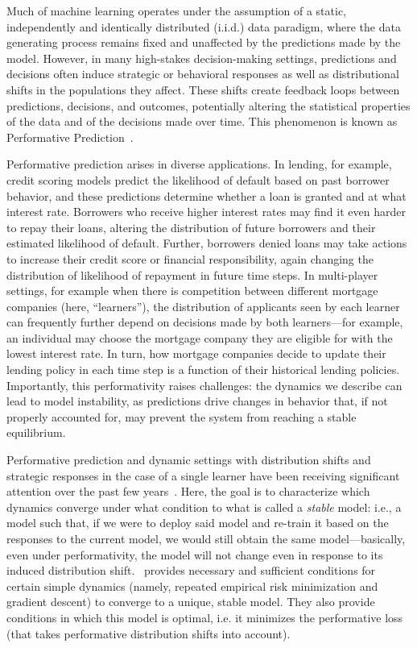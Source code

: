 Much of machine learning operates under the assumption of a static, independently and identically distributed (i.i.d.) data paradigm, where the data generating process remains fixed and unaffected by the predictions made by the model. However, in many high-stakes decision-making settings, predictions and decisions often induce strategic or behavioral responses as well as distributional shifts in the populations they affect. These shifts create feedback loops between predictions, decisions, and outcomes, potentially altering the statistical properties of the data and of the decisions made over time. This phenomenon is known as Performative Prediction~\cite{pmlr-v119-perdomo20a}. 

Performative prediction arises in diverse applications. In lending, for example, credit scoring models predict the likelihood of default based on past borrower behavior, and these predictions determine whether a loan is granted and at what interest rate. Borrowers who receive higher interest rates may find it even harder to repay their loans, altering the distribution of future borrowers and their estimated likelihood of default. Further, borrowers denied loans may take actions to increase their credit score or financial responsibility, again changing the distribution of likelihood of repayment in future time steps. In multi-player settings, for example when there is competition between different mortgage companies (here, ``learners''), the distribution of applicants seen by each learner can frequently further depend on decisions made by both learners---for example, an individual may choose the mortgage company they are eligible for with the lowest interest rate. In turn, how mortgage companies decide to update their lending policy in each time step is a function of their historical lending policies. Importantly, this performativity raises challenges: the dynamics we describe can lead to model instability, as predictions drive changes in behavior that, if not properly accounted for, may prevent the system from reaching a stable equilibrium. 

Performative prediction and dynamic settings with distribution shifts and strategic responses in the case of a single learner have been receiving significant attention over the past few years~\cite{pmlr-v119-perdomo20a, NEURIPS2020_33e75ff0, pmlr-v151-brown22a,bechavod2021gaming,shavit2020causal,mendler2020stochastic,hardt2022performative,hardt2023performative}. Here, the goal is to characterize which dynamics converge under what condition to what is called a \emph{stable} model: i.e., a model such that, if we were to deploy said model and re-train it based on the responses to the current model, we would still obtain the same model---basically, even under performativity, the model will not change even in response to its induced distribution shift.~\cite{pmlr-v119-perdomo20a} provides necessary and sufficient conditions for certain simple dynamics (namely, repeated empirical risk minimization and gradient descent) to converge to a unique, stable model. They also provide conditions in which this model is optimal, i.e. it minimizes the performative loss (that takes performative distribution shifts into account). 

